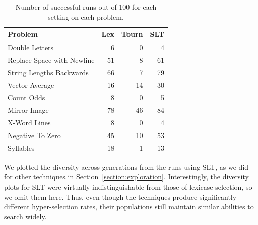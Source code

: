 \documentclass{sig-alternate}
\begin{document}
\begin{table}[t]
\centering
\caption{Number of successful runs out of 100 for each setting on each problem.}
\label{table:slt-results}
\begin{tabular}{lrrr}
\toprule
\textbf{Problem}                    & \textbf{Lex} & \textbf{Tourn} & \textbf{SLT} \\
\midrule
Double Letters             & 6        & 0          & 4   \\
Replace Space with Newline & 51       & 8          & 61  \\
String Lengths Backwards   & 66       & 7          & 79  \\
Vector Average             & 16       & 14         & 30  \\
Count Odds                 & 8        & 0          & 5   \\
Mirror Image               & 78       & 46         & 84  \\
X-Word Lines               & 8        & 0          & 4   \\
Negative To Zero           & 45       & 10         & 53  \\
Syllables                  & 18       & 1          & 13  \\
\bottomrule
\end{tabular}
\end{table}

We plotted the diversity across generations from the runs using SLT, as we did for other techniques in Section~\ref{section:exploration}. Interestingly, the diversity plots for SLT were virtually indistinguishable from those of lexicase selection, so we omit them here. Thus, even though the techniques produce significantly different hyper-selection rates, their populations still maintain similar abilities to search widely.
\end{document}
